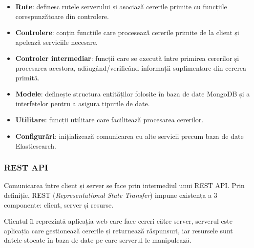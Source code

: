 \begin{itemize}
    \item \textbf{Rute}: definesc rutele serverului și asociază cererile primite cu funcțiile
    corespunzătoare din controlere.
    \item \textbf{Controlere}: conțin funcțiile care procesează cererile primite de la client
    și apelează serviciile necesare.
    \item \textbf{Controler intermediar}: funcții care se execută între primirea cererilor și procesarea
    acestora, adăugând/verificând informații suplimentare din cererea primită.
    \item \textbf{Modele}: definește structura entităților folosite în baza de date MongoDB 
    și a interfețelor pentru a asigura tipurile de date.
    \item \textbf{Utilitare}: funcții utilitare care facilitează procesarea cererilor.
    \item \textbf{Configurări}: inițializează comunicarea cu alte servicii precum baza de date Elasticsearch.
\end{itemize}

\subsubsection{REST API}
Comunicarea între client și server se face prin intermediul unui REST API. Prin definiție,
REST (\textit{Representational State Transfer}) impune existența a 3 componente: client, server și resurse.
\par
Clientul îl reprezintă aplicația web care face cereri către server, serverul este aplicația
care  gestionează cererile și returnează răspunsuri, iar resursele sunt datele stocate
în baza de date pe care serverul le manipulează.

